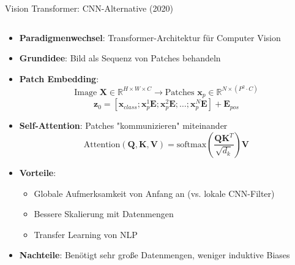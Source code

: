 \documentclass[aspectratio=1610, xcolor=dvipsnames, 9pt]{beamer}
\begin{document}
      \begin{frame}{Vision Transformer: CNN-Alternative (2020)}
        \begin{columns}
          \begin{column}{1\textwidth}
            \begin{itemize}
              \item \textbf{Paradigmenwechsel}: Transformer-Architektur für Computer Vision
              \item \textbf{Grundidee}: Bild als Sequenz von Patches behandeln
              \item \textbf{Patch Embedding}:
              \begin{equation}
                \text{Image } \mathbf{X} \in \mathbb{R}^{H \times W \times C} \rightarrow \text{Patches } \mathbf{x}_p \in \mathbb{R}^{N \times (P^2 \cdot C)}
              \end{equation}
              \begin{equation}
                \mathbf{z}_0 = [\mathbf{x}_{class}; \mathbf{x}_p^1 \mathbf{E}; \mathbf{x}_p^2 \mathbf{E}; \ldots; \mathbf{x}_p^N \mathbf{E}] + \mathbf{E}_{pos}
              \end{equation}
              \item \textbf{Self-Attention}: Patches "kommunizieren" miteinander
              \begin{equation}
                \text{Attention}(\mathbf{Q}, \mathbf{K}, \mathbf{V}) = \text{softmax}\left(\frac{\mathbf{Q}\mathbf{K}^T}{\sqrt{d_k}}\right)\mathbf{V}
              \end{equation}
              \item \textbf{Vorteile}:
              \begin{itemize}
                \item Globale Aufmerksamkeit von Anfang an (vs. lokale CNN-Filter)
                \item Bessere Skalierung mit Datenmengen
                \item Transfer Learning von NLP
              \end{itemize}
              \item \textbf{Nachteile}: Benötigt sehr große Datenmengen, weniger induktive Biases
            \end{itemize}
          \end{column}
        \end{columns}
      \end{frame}
\end{document}
